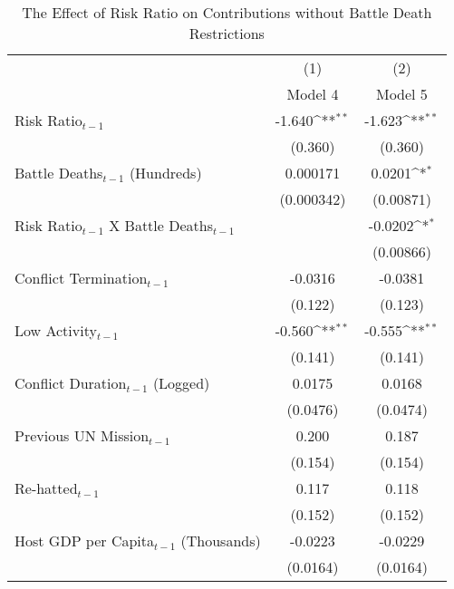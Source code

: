 \begin{table}[htbp]\centering
\fontsize{10}{10}\selectfont
\def\sym#1{\ifmmode^{#1}\else\(^{#1}\)\fi}
\caption{The Effect of Risk Ratio on Contributions without Battle Death Restrictions \label{Table 5}}
\begin{tabular}{l*{2}{c}}
\hline\hline
                    &\multicolumn{1}{c}{(1)}        &\multicolumn{1}{c}{(2)}        \\
                    &          Model 4        &          Model 5       \\
\hline
Risk Ratio$_{t-1}$          &      -1.640\sym{**}&      -1.623\sym{**}\\
                    &     (0.360)        &     (0.360)        \\
[0.25em]
Battle Deaths$_{t-1}$ (Hundreds)&    0.000171        &      0.0201\sym{*} \\
                    &  (0.000342)        &   (0.00871)        \\
[0.25em]
Risk Ratio$_{t-1}$ X Battle Deaths$_{t-1}$ &                    &     -0.0202\sym{*} \\
                    &                    &   (0.00866)        \\
[0.25em]
Conflict Termination$_{t-1}$&     -0.0316        &     -0.0381        \\
                    &     (0.122)        &     (0.123)        \\
[0.25em]
Low Activity$_{t-1}$        &      -0.560\sym{**}&      -0.555\sym{**}\\
                    &     (0.141)        &     (0.141)        \\
[0.25em]
Conflict Duration$_{t-1}$ (Logged)&      0.0175        &      0.0168        \\
                    &    (0.0476)        &    (0.0474)        \\
[0.25em]
Previous UN Mission$_{t-1}$ &       0.200        &       0.187        \\
                    &     (0.154)        &     (0.154)        \\
[0.25em]
Re-hatted$_{t-1}$           &       0.117        &       0.118        \\
                    &     (0.152)        &     (0.152)        \\
[0.25em]
Host GDP per Capita$_{t-1}$ (Thousands)&     -0.0223        &     -0.0229        \\
                    &    (0.0164)        &    (0.0164)        \\

\end{tabular}
\end{table}
